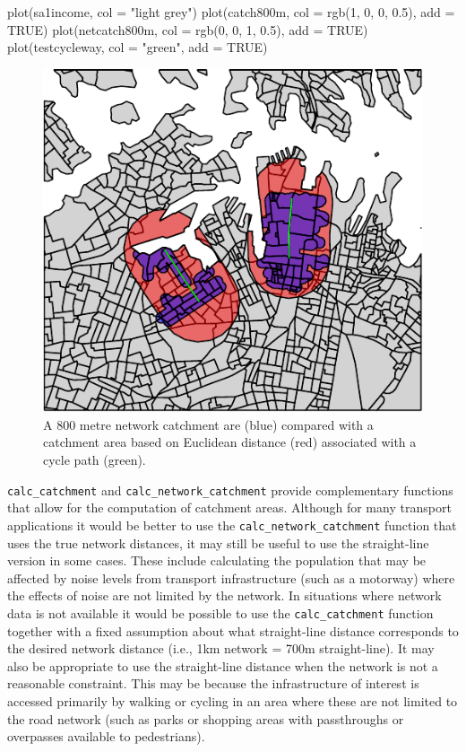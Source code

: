 \begin{Schunk}
\begin{Sinput}
plot(sa1income, col = "light grey")
plot(catch800m, col = rgb(1, 0, 0, 0.5), add = TRUE)
plot(netcatch800m, col = rgb(0, 0, 1, 0.5), add = TRUE)
plot(testcycleway, col = "green", add = TRUE)
\end{Sinput}
\begin{figure}
\includegraphics[center]{netcatchplot-1} \caption[A 800 metre network catchment are (blue) compared with a catchment area based on Euclidean distance (red) associated with a cycle path (green)]{A 800 metre network catchment are (blue) compared with a catchment area based on Euclidean distance (red) associated with a cycle path (green).}\label{fig:netcatchplot}
\end{figure}
\end{Schunk}

\texttt{calc\_catchment} and \texttt{calc\_network\_catchment} provide complementary functions that allow for the computation of catchment areas.
Although for many transport applications it would be better to use the \texttt{calc\_network\_catchment} function that uses the true network distances, it may still be useful to use the straight-line version in some cases.
These include calculating the population that may be affected by noise levels from transport infrastructure (such as a motorway) where the effects of noise are not limited by the network.
In situations where network data is not available it would be possible to use the \texttt{calc\_catchment} function together with a fixed assumption about what straight-line distance corresponds to the desired network distance (i.e., 1km network = 700m straight-line).
It may also be appropriate to use the straight-line distance when the network is not a reasonable constraint.
This may be because the infrastructure of interest is accessed primarily by walking or cycling in an area where these are not limited to the road network (such as parks or shopping areas with passthroughs or overpasses available to pedestrians).

